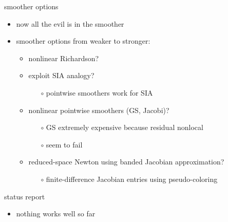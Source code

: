 \documentclass[usepdftitle=false,usenames,dvipsnames]{beamer}
\begin{document}
\begin{frame}{smoother options}

\begin{itemize}
\item now all the evil is in the smoother
\item smoother options from weaker to stronger:
    \begin{itemize}
    \item nonlinear Richardson?
    \item exploit SIA analogy?
        \begin{itemize}
        \item[{\color{black} $\circ$}] pointwise smoothers work for SIA
        \end{itemize}
    \item nonlinear pointwise smoothers (GS, Jacobi)?
        \begin{itemize}
        \item[{\color{black} $\circ$}] \alert{GS extremely expensive because residual nonlocal}
        \item[{\color{black} $\circ$}] seem to fail
        \end{itemize}
    \item reduced-space Newton using banded Jacobian approximation?
        \begin{itemize}
        \item[{\color{black} $\circ$}] finite-difference Jacobian entries using pseudo-coloring
        \end{itemize}
    \end{itemize}
\end{itemize}
\end{frame}


\begin{frame}{status report}

\begin{itemize}
\item \alert{nothing works well so far}
\end{itemize}
\end{frame}
\end{document}
